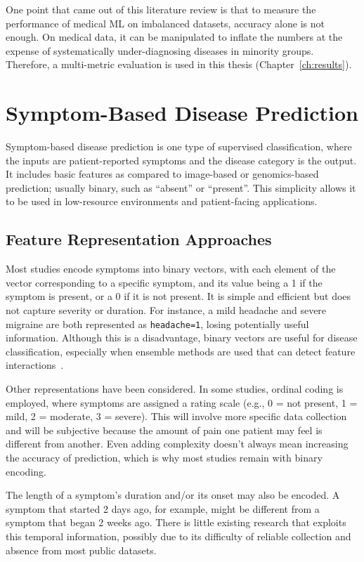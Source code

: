 One point that came out of this literature review is that to measure the performance of medical ML on imbalanced datasets, accuracy alone is not enough. On medical data, it can be manipulated to inflate the numbers at the expense of systematically under-diagnosing diseases in minority groups. Therefore, a multi-metric evaluation is used in this thesis (Chapter~\ref{ch:results}).

\section{Symptom-Based Disease Prediction}
\label{sec:symptom_prediction}

Symptom-based disease prediction is one type of supervised classification, where the inputs are patient-reported symptoms and the disease category is the output. It includes basic features as compared to image-based or genomics-based prediction; usually binary, such as ``absent'' or ``present''. This simplicity allows it to be used in low-resource environments and patient-facing applications.

\subsection{Feature Representation Approaches}

Most studies encode symptoms into binary vectors, with each element of the vector corresponding to a specific symptom, and its value being a 1 if the symptom is present, or a 0 if it is not present. It is simple and efficient but does not capture severity or duration. For instance, a mild headache and severe migraine are both represented as \texttt{headache=1}, losing potentially useful information. Although this is a disadvantage, binary vectors are useful for disease classification, especially when ensemble methods are used that can detect feature interactions~\citep{Breiman2001}.

Other representations have been considered. In some studies, ordinal coding is employed, where symptoms are assigned a rating scale (e.g., 0 = not present, 1 = mild, 2 = moderate, 3 = severe). This will involve more specific data collection and will be subjective because the amount of pain one patient may feel is different from another. Even adding complexity doesn't always mean increasing the accuracy of prediction, which is why most studies remain with binary encoding.

The length of a symptom's duration and/or its onset may also be encoded. A symptom that started 2 days ago, for example, might be different from a symptom that began 2 weeks ago. There is little existing research that exploits this temporal information, possibly due to its difficulty of reliable collection and absence from most public datasets.

